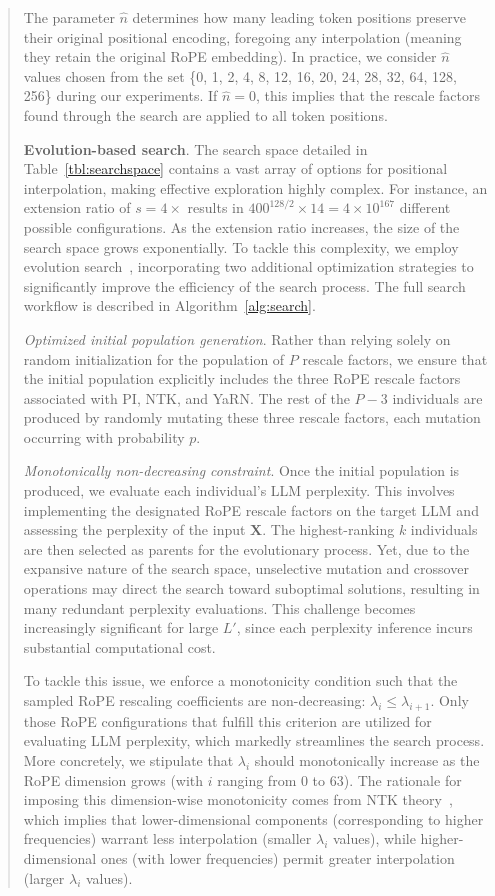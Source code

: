 \begin{abstract}
The parameter $\hat{n}$ determines how many leading token positions preserve their original positional encoding, foregoing any interpolation (meaning they retain the original RoPE embedding). In practice, we consider $\hat{n}$ values chosen from the set \{0, 1, 2, 4, 8, 12, 16, 20, 24, 28, 32, 64, 128, 256\} during our experiments. If $\hat{n}=0$, this implies that the rescale factors found through the search are applied to all token positions.

\textbf{Evolution-based search}. The search space detailed in Table~\ref{tbl:searchspace} contains a vast array of options for positional interpolation, making effective exploration highly complex. For instance, an extension ratio of $s=4\times$ results in $400^{128/2}\times14=4\times10^{167}$ different possible configurations. As the extension ratio increases, the size of the search space grows exponentially. To tackle this complexity, we employ evolution search~\cite{guo2020single}, incorporating two additional optimization strategies to significantly improve the efficiency of the search process. The full search workflow is described in Algorithm~\ref{alg:search}.

\textit{Optimized initial population generation}. Rather than relying solely on random initialization for the population of $P$ rescale factors, we ensure that the initial population explicitly includes the three RoPE rescale factors associated with PI, NTK, and YaRN. The rest of the $P-3$ individuals are produced by randomly mutating these three rescale factors, each mutation occurring with probability $p$.

\textit{Monotonically non-decreasing constraint}. Once the initial population is produced, we evaluate each individual’s LLM perplexity. This involves implementing the designated RoPE rescale factors on the target LLM and assessing the perplexity of the input $\mathbf{X}$. The highest-ranking $k$ individuals are then selected as parents for the evolutionary process. Yet, due to the expansive nature of the search space, unselective mutation and crossover operations may direct the search toward suboptimal solutions, resulting in many redundant perplexity evaluations. This challenge becomes increasingly significant for large $L'$, since each perplexity inference incurs substantial computational cost.

To tackle this issue, we enforce a monotonicity condition such that the sampled RoPE rescaling coefficients are non-decreasing: $\lambda_i \leq \lambda_{i+1}$. Only those RoPE configurations that fulfill this criterion are utilized for evaluating LLM perplexity, which markedly streamlines the search process. More concretely, we stipulate that $\lambda_i$ should monotonically increase as the RoPE dimension grows (with $i$ ranging from 0 to 63). The rationale for imposing this dimension-wise monotonicity comes from NTK theory~\cite{jacot2018neural,tancik2020fourier,ntk}, which implies that lower-dimensional components (corresponding to higher frequencies) warrant less interpolation (smaller $\lambda_i$ values), while higher-dimensional ones (with lower frequencies) permit greater interpolation (larger $\lambda_i$ values).


\end{abstract}
